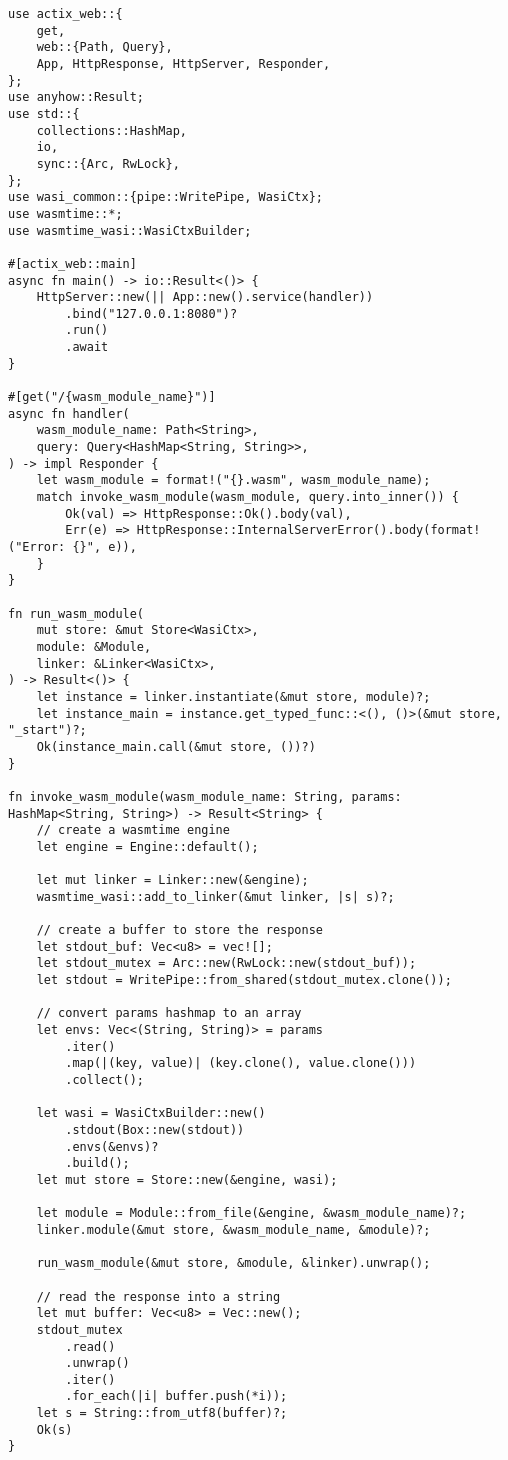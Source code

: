 \begin{lstlisting}[frame=lines, style=Rust, caption={Simple Proof of Concept Wasm Serverless Platform using Actix and Wasmtime}, showstringspaces=false, captionpos=b,]
use actix_web::{
    get,
    web::{Path, Query},
    App, HttpResponse, HttpServer, Responder,
};
use anyhow::Result;
use std::{
    collections::HashMap,
    io,
    sync::{Arc, RwLock},
};
use wasi_common::{pipe::WritePipe, WasiCtx};
use wasmtime::*;
use wasmtime_wasi::WasiCtxBuilder;

#[actix_web::main]
async fn main() -> io::Result<()> {
    HttpServer::new(|| App::new().service(handler))
        .bind("127.0.0.1:8080")?
        .run()
        .await
}

#[get("/{wasm_module_name}")]
async fn handler(
    wasm_module_name: Path<String>,
    query: Query<HashMap<String, String>>,
) -> impl Responder {
    let wasm_module = format!("{}.wasm", wasm_module_name);
    match invoke_wasm_module(wasm_module, query.into_inner()) {
        Ok(val) => HttpResponse::Ok().body(val),
        Err(e) => HttpResponse::InternalServerError().body(format!("Error: {}", e)),
    }
}

fn run_wasm_module(
    mut store: &mut Store<WasiCtx>,
    module: &Module,
    linker: &Linker<WasiCtx>,
) -> Result<()> {
    let instance = linker.instantiate(&mut store, module)?;
    let instance_main = instance.get_typed_func::<(), ()>(&mut store, "_start")?;
    Ok(instance_main.call(&mut store, ())?)
}

fn invoke_wasm_module(wasm_module_name: String, params: HashMap<String, String>) -> Result<String> {
    // create a wasmtime engine
    let engine = Engine::default();

    let mut linker = Linker::new(&engine);
    wasmtime_wasi::add_to_linker(&mut linker, |s| s)?;

    // create a buffer to store the response
    let stdout_buf: Vec<u8> = vec![];
    let stdout_mutex = Arc::new(RwLock::new(stdout_buf));
    let stdout = WritePipe::from_shared(stdout_mutex.clone());

    // convert params hashmap to an array
    let envs: Vec<(String, String)> = params
        .iter()
        .map(|(key, value)| (key.clone(), value.clone()))
        .collect();

    let wasi = WasiCtxBuilder::new()
        .stdout(Box::new(stdout))
        .envs(&envs)?
        .build();
    let mut store = Store::new(&engine, wasi);

    let module = Module::from_file(&engine, &wasm_module_name)?;
    linker.module(&mut store, &wasm_module_name, &module)?;

    run_wasm_module(&mut store, &module, &linker).unwrap();

    // read the response into a string
    let mut buffer: Vec<u8> = Vec::new();
    stdout_mutex
        .read()
        .unwrap()
        .iter()
        .for_each(|i| buffer.push(*i));
    let s = String::from_utf8(buffer)?;
    Ok(s)
}
\end{lstlisting}